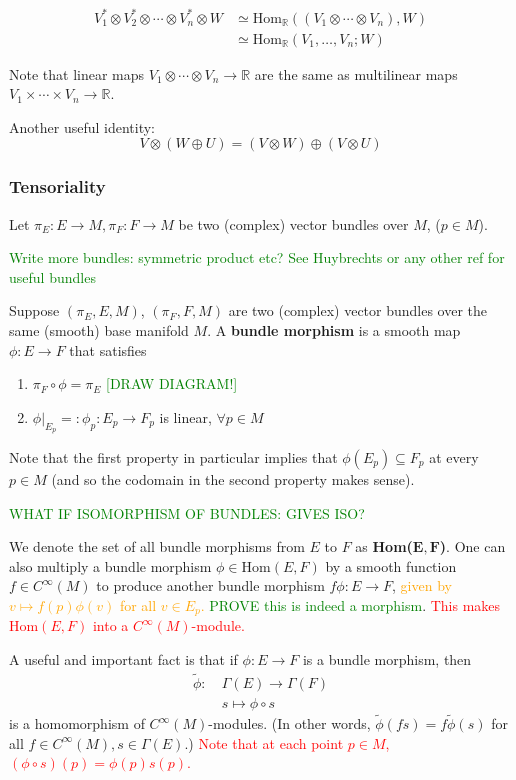 \documentclass[a4paper]{article}
\theoremstyle{definition} \newtheorem*{definition}{Definition}
\theoremstyle{definition} \newtheorem*{definitions}{Definitions}
\theoremstyle{plain} \newtheorem{theorem}{Theorem}[section]
\theoremstyle{plain} \newtheorem{proposition}[theorem]{Proposition}
\theoremstyle{plain} \newtheorem{corollary}[theorem]{Corollary}
\theoremstyle{plain} \newtheorem{lemma}[theorem]{Lemma}
\theoremstyle{plain} \newtheorem{example}[theorem]{Example}
\newcommand{\checkCorrect}[1]{\textcolor{red}{#1}}
\newcommand{\understandBetter}[1]{\textcolor{orange}{#1}}
\newcommand{\finish}[1]{\textcolor{green}{#1}}
\newcommand{\defn}[1]{\textbf{#1}}
\newcommand{\realnos}{\mathbb{R}}
\newcommand{\Hom}{\text{Hom}}
\begin{document}
\begin{align*}
V_1^* \otimes V_2^* \otimes \cdots \otimes V_n^* \otimes W & \simeq \Hom_\realnos((V_1\otimes \cdots \otimes V_n), W) \\
& \simeq \Hom_\realnos (V_1, \ldots, V_n; W) 
\end{align*}

Note that linear maps $V_1\otimes \cdots \otimes V_n\to \realnos$ are the same as multilinear maps $V_1\times \cdots \times V_n \to \realnos$.

Another useful identity:
$$V\otimes (W\oplus U)=(V\otimes W)\oplus (V\otimes U)$$

\subsubsection{Tensoriality}
Let $\pi_E:E\to M, \pi_F:F\to M$ be two (complex) vector bundles over $M$, ($p\in M$).

\finish{Write more bundles: symmetric product etc? See Huybrechts or any other ref for useful bundles}

Suppose $(\pi_E, E, M)$, $(\pi_F, F, M)$ are two (complex) vector bundles over the same (smooth) base manifold $M$. A \defn{bundle morphism} is a smooth map $\phi:E\to F$ that satisfies
\begin{enumerate}
    \item $\pi_F\circ \phi = \pi_E$ \finish{[DRAW DIAGRAM!]}
    \item $\phi \vert_{E_p}=:\phi_p:E_p\to F_p$ is linear, $\forall p\in M$
\end{enumerate}
Note that the first property in particular implies that $\phi(E_p)\subseteq F_p$ at every $p\in M$ (and so the codomain in the second property makes sense).  

\finish{WHAT IF ISOMORPHISM OF BUNDLES: GIVES ISO?}

We denote the set of all bundle morphisms from $E$ to $F$ as \defn{Hom($\mathbf{E, F}$)}. One can also multiply a bundle morphism $\phi \in \text{Hom}(E, F)$ by a smooth function $f\in C^\infty (M)$ to produce another bundle morphism $f \phi :E\to F$,
\understandBetter{given by $v\mapsto f(p)\phi(v)$ for all $v\in E_p$.} \finish{PROVE this is indeed a morphism}. 
\checkCorrect{This makes $\text{Hom}(E, F)$ into a $C^\infty(M)$-module.} 

A useful and important fact is that if $\phi:E\to F$ is a bundle morphism, then 
\begin{align*}
\tilde{\phi}:\ & \Gamma(E)\to \Gamma(F) \\
& s \mapsto \phi \circ s
\end{align*}
is a homomorphism of $C^\infty(M)$-modules. (In other words, $\tilde{\phi}(fs)=f\tilde{\phi}(s)$ for all $f\in C^\infty (M), s\in \Gamma(E)$.) \checkCorrect{Note that at each point $p\in M$, $(\phi\circ s)(p)=\phi(p)s(p)$.}
\end{document}
